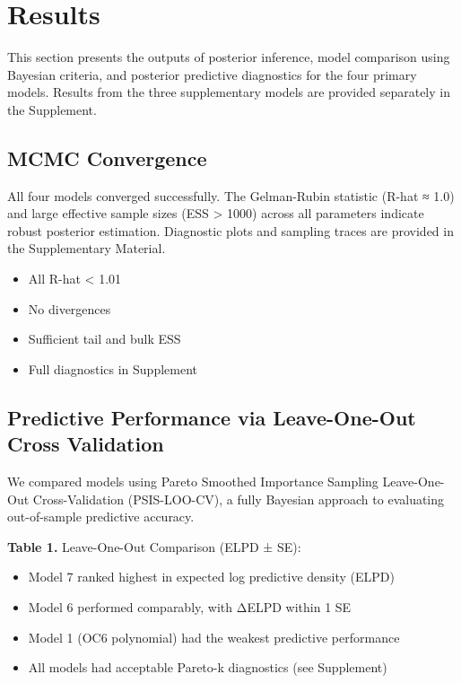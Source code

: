 \documentclass[
]{agujournal2019}
\providecommand{\tightlist}{%
  \setlength{\itemsep}{0pt}\setlength{\parskip}{0pt}}\usepackage{longtable,booktabs,array}
\begin{document}
\section{Results}\label{results}

This section presents the outputs of posterior inference, model
comparison using Bayesian criteria, and posterior predictive diagnostics
for the four primary models. Results from the three supplementary models
are provided separately in the Supplement.

\subsection{MCMC Convergence}\label{mcmc-convergence}

All four models converged successfully. The Gelman-Rubin statistic
(R-hat ≈ 1.0) and large effective sample sizes (ESS \textgreater{} 1000)
across all parameters indicate robust posterior estimation. Diagnostic
plots and sampling traces are provided in the Supplementary Material.

\begin{itemize}
\tightlist
\item
  All R-hat \textless{} 1.01
\item
  No divergences
\item
  Sufficient tail and bulk ESS
\item
  Full diagnostics in Supplement
\end{itemize}

\subsection{Predictive Performance via Leave-One-Out Cross
Validation}\label{predictive-performance-via-leave-one-out-cross-validation}

We compared models using Pareto Smoothed Importance Sampling
Leave-One-Out Cross-Validation (PSIS-LOO-CV), a fully Bayesian approach
to evaluating out-of-sample predictive accuracy.

\textbf{Table 1.} Leave-One-Out Comparison (ELPD ± SE):

\begin{itemize}
\tightlist
\item
  Model 7 ranked highest in expected log predictive density (ELPD)
\item
  Model 6 performed comparably, with ΔELPD within 1 SE
\item
  Model 1 (OC6 polynomial) had the weakest predictive performance
\item
  All models had acceptable Pareto-k diagnostics (see Supplement)
\end{itemize}
\end{document}
